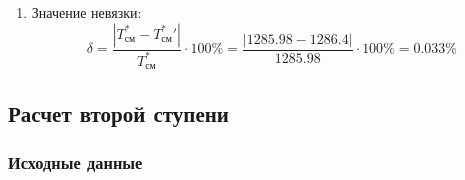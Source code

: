 \documentclass[a4paper,10pt]{article}
\begin{document}
\begin{enumerate}
\begin{enumerate}
            \item Значение невязки:
            \[
                \delta = \frac{ \left| T_{см}^{*} - T_{см}^*\prime \right| }{T_{см}^{*}} \cdot 100 \% =
                    \frac{
                        \left| 1285.98 - 1286.4 \right|
                    }{
                        1285.98
                    } \cdot 100 \% =
                0.033 \%
            \]

        \end{enumerate}

        

    \end{enumerate}
    

    \subsection{Расчет второй ступени}

    \subsubsection{Исходные данные}
\end{document}
